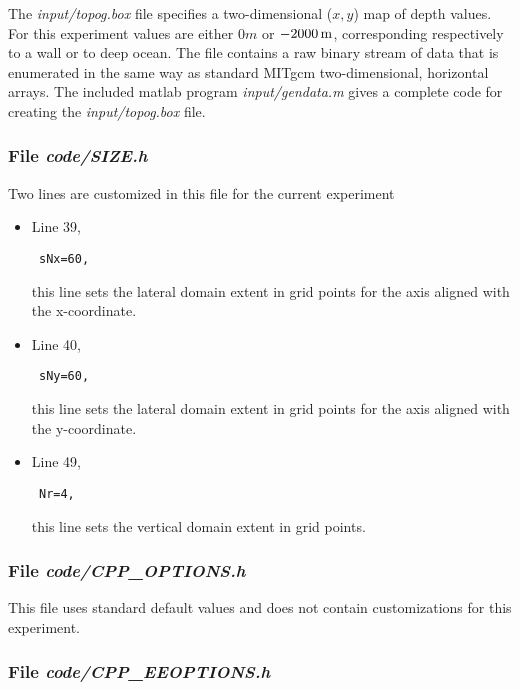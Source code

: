 The {\it input/topog.box} file specifies a two-dimensional ($x,y$) 
map of depth values. For this experiment values are either
$0m$ or $-2000\,{\rm m}$, corresponding respectively to a wall or to deep
ocean. The file contains a raw binary stream of data that is enumerated
in the same way as standard MITgcm two-dimensional, horizontal arrays.
The included matlab program {\it input/gendata.m} gives a complete
code for creating the {\it input/topog.box} file.

\subsubsection{File {\it code/SIZE.h}}

Two lines are customized in this file for the current experiment

\begin{itemize}

\item Line 39, 
\begin{verbatim} sNx=60, \end{verbatim} this line sets
the lateral domain extent in grid points for the
axis aligned with the x-coordinate.

\item Line 40, 
\begin{verbatim} sNy=60, \end{verbatim} this line sets
the lateral domain extent in grid points for the
axis aligned with the y-coordinate.

\item Line 49, 
\begin{verbatim} Nr=4,   \end{verbatim} this line sets
the vertical domain extent in grid points.

\end{itemize}

\begin{small}
% 
\end{small}

\subsubsection{File {\it code/CPP\_OPTIONS.h}}

This file uses standard default values and does not contain
customizations for this experiment.


\subsubsection{File {\it code/CPP\_EEOPTIONS.h}}

